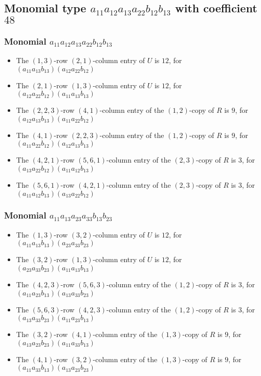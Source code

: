 \documentclass{article}
\begin{document}
\subsection{Monomial type $ a_{11} a_{12} a_{13} a_{22} b_{12} b_{13} $ with coefficient $ 48 $}

\subsubsection{Monomial $ a_{11} a_{12} a_{13} a_{22} b_{12} b_{13} $}

\begin{itemize}
\item The $ \left(1, 3\right) $-row $ \left(2, 1\right) $-column entry of $U$ is $ 12 $, for $( a_{11} a_{13} b_{13} )( a_{12} a_{22} b_{12} )$ 
\item The $ \left(2, 1\right) $-row $ \left(1, 3\right) $-column entry of $U$ is $ 12 $, for $( a_{12} a_{22} b_{12} )( a_{11} a_{13} b_{13} )$ 
\item The $(2, 2, 3)$-row $(4, 1)$-column entry of the $ \left(1, 2\right) $-copy of $R$ is $ 9 $, for $( a_{12} a_{13} b_{13} )( a_{11} a_{22} b_{12} )$ 
\item The $(4, 1)$-row $(2, 2, 3)$-column entry of the $ \left(1, 2\right) $-copy of $R$ is $ 9 $, for $( a_{11} a_{22} b_{12} )( a_{12} a_{13} b_{13} )$ 
\item The $(4, 2, 1)$-row $(5, 6, 1)$-column entry of the $ \left(2, 3\right) $-copy of $R$ is $ 3 $, for $( a_{13} a_{22} b_{12} )( a_{11} a_{12} b_{13} )$ 
\item The $(5, 6, 1)$-row $(4, 2, 1)$-column entry of the $ \left(2, 3\right) $-copy of $R$ is $ 3 $, for $( a_{11} a_{12} b_{13} )( a_{13} a_{22} b_{12} )$ 
\end{itemize}
\subsubsection{Monomial $ a_{11} a_{13} a_{23} a_{33} b_{13} b_{23} $}

\begin{itemize}
\item The $ \left(1, 3\right) $-row $ \left(3, 2\right) $-column entry of $U$ is $ 12 $, for $( a_{11} a_{13} b_{13} )( a_{23} a_{33} b_{23} )$ 
\item The $ \left(3, 2\right) $-row $ \left(1, 3\right) $-column entry of $U$ is $ 12 $, for $( a_{23} a_{33} b_{23} )( a_{11} a_{13} b_{13} )$ 
\item The $(4, 2, 3)$-row $(5, 6, 3)$-column entry of the $ \left(1, 2\right) $-copy of $R$ is $ 3 $, for $( a_{11} a_{23} b_{13} )( a_{13} a_{33} b_{23} )$ 
\item The $(5, 6, 3)$-row $(4, 2, 3)$-column entry of the $ \left(1, 2\right) $-copy of $R$ is $ 3 $, for $( a_{13} a_{33} b_{23} )( a_{11} a_{23} b_{13} )$ 
\item The $(3, 2)$-row $(4, 1)$-column entry of the $ \left(1, 3\right) $-copy of $R$ is $ 9 $, for $( a_{13} a_{23} b_{23} )( a_{11} a_{33} b_{13} )$ 
\item The $(4, 1)$-row $(3, 2)$-column entry of the $ \left(1, 3\right) $-copy of $R$ is $ 9 $, for $( a_{11} a_{33} b_{13} )( a_{13} a_{23} b_{23} )$ 
\end{itemize}
\end{document}
